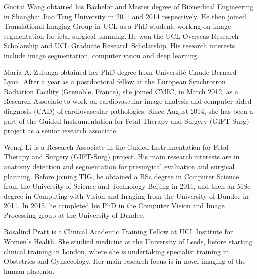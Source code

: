 \documentclass[10pt,journal,compsoc]{IEEEtran}
\begin{document}
\begin{IEEEbiography}{Guotai Wang}
obtained his Bachelor and Master degree of Biomedical Engineering in Shanghai Jiao Tong University in 2011 and 2014 respectively. %
He then joined Translational Imaging Group in UCL as a PhD student, working on image segmentation for fetal surgical planning. He won the UCL Overseas Research Scholarship and UCL Graduate Research Scholarship. His research interests include image segmentation, computer vision and deep learning.

\end{IEEEbiography}
\begin{IEEEbiography}{Maria A. Zuluaga}
obtained her PhD degree from Université Claude Bernard Lyon. %
After a year as a postdoctoral fellow at the European Synchrotron Radiation Facility (Grenoble, France), she joined CMIC, in March 2012, as a Research Associate to work on cardiovascular image analysis and computer-aided diagnosis (CAD) of cardiovascular pathologies. Since August 2014, she has been a part of the Guided Instrumentation for Fetal Therapy and Surgery (GIFT-Surg) project as a senior research associate.
\end{IEEEbiography}
\begin{IEEEbiography}{Wenqi Li} is a Research Associate in the Guided Instrumentation for Fetal Therapy and Surgery (GIFT-Surg) project. His main research interests are in anatomy detection and segmentation for presurgical evaluation and surgical planning. Before joining TIG, he obtained a BSc degree in Computer Science from the University of Science and Technology Beijing in 2010, and then an MSc degree in Computing with Vision and Imaging from the University of Dundee in 2011. In 2015, he completed his PhD in the Computer Vision and Image Processing group at the University of Dundee.
\end{IEEEbiography}

\begin{IEEEbiography}{Rosalind Pratt} is a Clinical Academic Training Fellow at UCL Institute for Women's Health. She studied medicine at the University of Leeds, before starting clinical training in London, where she is undertaking specialist training in Obstetrics and Gynaecology. Her main research focus is in novel imaging of the human placenta.
\end{IEEEbiography}
\end{document}
